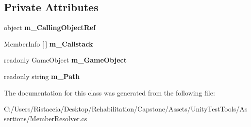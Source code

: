 \subsection*{Private Attributes}
\begin{DoxyCompactItemize}
\item 
\mbox{\label{class_unity_test_1_1_member_resolver_a036702e750d2256941be4fb4cb4f58e0}} 
object {\bfseries m\+\_\+\+Calling\+Object\+Ref}
\item 
\mbox{\label{class_unity_test_1_1_member_resolver_a224a0967852fdc4c975a5b8161d96399}} 
Member\+Info \mbox{[}$\,$\mbox{]} {\bfseries m\+\_\+\+Callstack}
\item 
\mbox{\label{class_unity_test_1_1_member_resolver_a9d484d94a4dd73272c6f20d496c2f05e}} 
readonly Game\+Object {\bfseries m\+\_\+\+Game\+Object}
\item 
\mbox{\label{class_unity_test_1_1_member_resolver_a327de8e363f54121b8209f16cb7b3687}} 
readonly string {\bfseries m\+\_\+\+Path}
\end{DoxyCompactItemize}


The documentation for this class was generated from the following file\+:\begin{DoxyCompactItemize}
\item 
C\+:/\+Users/\+Ristaccia/\+Desktop/\+Rehabilitation/\+Capstone/\+Assets/\+Unity\+Test\+Tools/\+Assertions/Member\+Resolver.\+cs\end{DoxyCompactItemize}
